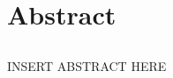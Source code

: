 \renewcommand{\CVSrevision}{\version$Id: abstract.tex,v 1.3 2009/07/12 19:28:06 ith Exp $}
% 
% 
\chapter*{Abstract}
\section*{}
INSERT ABSTRACT HERE
